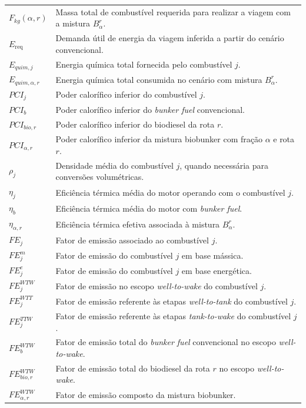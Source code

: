 \begin{table}[!ht]
\begin{tabular}{@{}L{1.8cm} L{12.8cm}@{}}
$F_{kg}(\alpha,r)$ & Massa total de combustível requerida para realizar a viagem com a mistura $B_{\alpha}^{r}$. \\
$E_{\text{req}}$ & Demanda útil de energia da viagem inferida a partir do cenário convencional. \\
$E_{quim,j}$ & Energia química total fornecida pelo combustível $j$. \\
$E_{quim,\alpha,r}$ & Energia química total consumida no cenário com mistura $B_{\alpha}^{r}$. \\
$PCI_j$ & Poder calorífico inferior do combustível $j$. \\
$PCI_b$ & Poder calorífico inferior do \emph{bunker fuel} convencional. \\
$PCI_{bio,r}$ & Poder calorífico inferior do biodiesel da rota $r$. \\
$PCI_{\alpha,r}$ & Poder calorífico inferior da mistura biobunker com fração $\alpha$ e rota $r$. \\
$\rho_j$ & Densidade média do combustível $j$, quando necessária para conversões volumétricas. \\
$\eta_j$ & Eficiência térmica média do motor operando com o combustível $j$. \\
$\eta_b$ & Eficiência térmica média do motor com \emph{bunker fuel}. \\
$\eta_{\alpha,r}$ & Eficiência térmica efetiva associada à mistura $B_{\alpha}^{r}$. \\
$FE_j$ & Fator de emissão associado ao combustível $j$. \\
$FE_j^{m}$ & Fator de emissão do combustível $j$ em base mássica. \\
$FE_j^{e}$ & Fator de emissão do combustível $j$ em base energética. \\
$FE_j^{WTW}$ & Fator de emissão no escopo \emph{well-to-wake} do combustível $j$. \\
$FE_j^{WTT}$ & Fator de emissão referente às etapas \emph{well-to-tank} do combustível $j$. \\
$FE_j^{TTW}$ & Fator de emissão referente às etapas \emph{tank-to-wake} do combustível $j$. \\
$FE_b^{WTW}$ & Fator de emissão total do \emph{bunker fuel} convencional no escopo \emph{well-to-wake}. \\
$FE_{bio,r}^{WTW}$ & Fator de emissão total do biodiesel da rota $r$ no escopo \emph{well-to-wake}. \\
$FE_{\alpha,r}^{WTW}$ & Fator de emissão composto da mistura biobunker. \\

\end{tabular}
\end{table}
